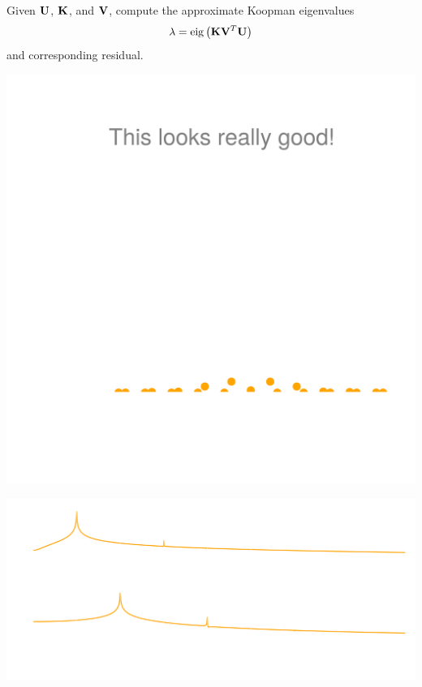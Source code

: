 \documentclass[aspectratio=169, usenames, dvipsnames]{beamer}
\begin{document}
\begin{frame}
  \vfill
  \begin{minipage}{.48\textwidth}
    Given $\vb{U}$, $\vb{K}$, and $\vb{V}$, compute the approximate Koopman eigenvalues
    \[
      \lambda = \mathrm{eig}\left( \vb{K} \vb{V}^T \vb{U} \right)
    \]
    and corresponding residual.
  \end{minipage}%
  \hfill
  \begin{minipage}{.48\textwidth}
    \centering
    \includegraphics[width=\textwidth]{Cylinder_eigenvalues_residual}
  \end{minipage}

  \vfill
\end{frame}

\begin{frame}
  \vfill
  \centering
  \includegraphics[width=\textwidth]{Cylinder_fft}
  \vfill
\end{frame}
\end{document}

